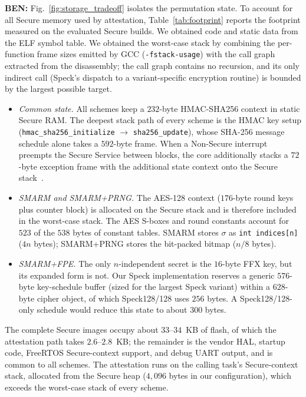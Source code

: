 \documentclass{ieeeaccess}
\DeclareRobustCommand{\ben}[1]{{\color{BENcolor}\textbf{BEN:} #1}}
\newcommand{\rtsmarmone}{SMARM+PRNG\xspace}
\newcommand{\rtsmarmtwo}{SMARM+FPE\xspace}
\begin{document}
\ben{Fig.~\ref{fig:storage_tradeoff} isolates the permutation state.
To account for all Secure memory used by attestation, Table~\ref{tab:footprint} reports the footprint measured on the evaluated Secure builds.
We obtained code and static data from the ELF symbol table.
We obtained the worst-case stack by combining the per-function frame sizes emitted by GCC (\texttt{-fstack-usage}) with the call graph extracted from the disassembly; the call graph contains no recursion, and its only indirect call (Speck's dispatch to a variant-specific encryption routine) is bounded by the largest possible target.
\begin{itemize}
  \item \emph{Common state.} All schemes keep a $232$-byte HMAC-SHA256 context in static Secure RAM.
  The deepest stack path of every scheme is the HMAC key setup (\texttt{hmac\_sha256\_initialize} $\rightarrow$ \texttt{sha256\_update}), whose SHA-256 message schedule alone takes a $592$-byte frame.
  When a Non-Secure interrupt preempts the Secure Service between blocks, the core additionally stacks a $72$-byte exception frame with the additional state context onto the Secure stack~\cite{armv8m-arm}.
  \item \emph{SMARM and \rtsmarmone.} The AES-128 context ($176$-byte round keys plus counter block) is allocated on the Secure stack and is therefore included in the worst-case stack.
  The AES S-boxes and round constants account for $523$ of the $538$ bytes of constant tables.
  SMARM stores $\sigma$ as \texttt{int indices[n]} ($4n$ bytes); \rtsmarmone stores the bit-packed bitmap ($n/8$ bytes).
  \item \emph{\rtsmarmtwo.} The only $n$-independent secret is the $16$-byte FFX key, but its expanded form is not.
  Our Speck implementation reserves a generic $576$-byte key-schedule buffer (sized for the largest Speck variant) within a $628$-byte cipher object, of which Speck128/128 uses $256$ bytes.
  A Speck128/128-only schedule would reduce this state to about $300$ bytes.
\end{itemize}
The complete Secure images occupy about $33$--$34$~KB of flash, of which the attestation path takes $2.6$--$2.8$~KB; the remainder is the vendor HAL, startup code, FreeRTOS Secure-context support, and debug UART output, and is common to all schemes.
The attestation runs on the calling task's Secure-context stack, allocated from the Secure heap ($4{,}096$ bytes in our configuration), which exceeds the worst-case stack of every scheme.}
\end{document}
